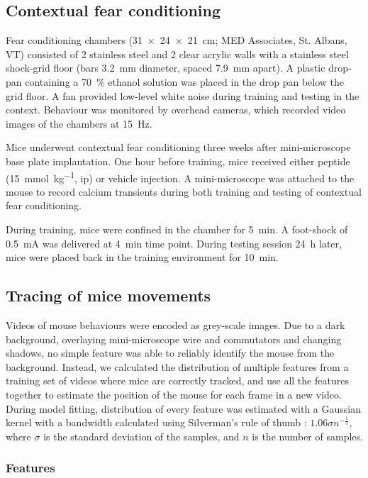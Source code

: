 \subsection{Contextual fear conditioning}
Fear conditioning chambers (\SI{31 x 24 x 21}{\cm}; MED Associates, St. Albans, VT) consisted of 2 stainless steel and 2 clear acrylic walls with a stainless steel shock-grid floor (bars \SI{3.2}{\mm} diameter, spaced \SI{7.9}{\mm} apart). A plastic drop-pan containing a \SI{70}{\percent} ethanol solution was placed in the drop pan below the grid floor. A fan provided low-level white noise during training and testing in the context. Behaviour was monitored by overhead cameras, which recorded video images of the chambers at \SI{15}{\Hz}. 

Mice underwent contextual fear conditioning three weeks after mini-microscope base plate implantation. One hour before training, mice received either \tglu{} peptide (\SI{15}{\mmol\per\kg}, \gls{ip}) or vehicle injection. A mini-microscope was attached to the mouse to record calcium transients during both training and testing of contextual fear conditioning. 

During training, mice were confined in the chamber for \SI{5}{\minute}. A foot-shock of \SI{0.5}{\mA} was delivered at \SI{4}{\minute} time point. During testing session \SI{24}{\hour} later, mice were placed back in the training environment for \SI{10}{\minute}. 

\subsection{Tracing of mice movements}
Videos of mouse behaviours were encoded as grey-scale images. Due to a dark background, overlaying mini-microscope wire and commutators and changing shadows, no simple feature was able to reliably identify the mouse from the background. Instead, we calculated the distribution of multiple features from a training set of videos where mice are correctly tracked, and use all the features together to estimate the position of the mouse for each frame in a new video. During model fitting, distribution of every feature was estimated with a Gaussian kernel with a bandwidth calculated using Silverman's rule of thumb \citep{silverman86}: $1.06\sigma n^{-\frac{1}{5}}$, where $\sigma$ is the standard deviation of the samples, and $n$ is the number of samples.

\subsubsection{Features}


